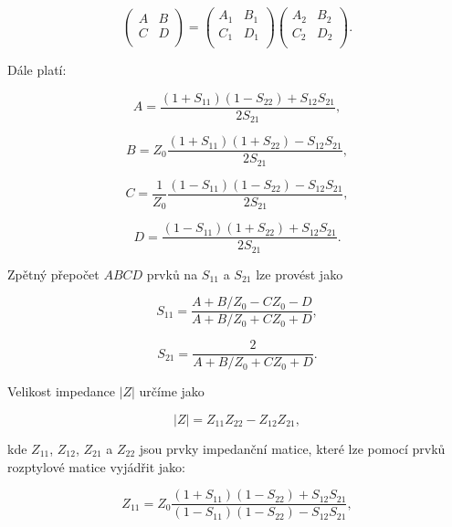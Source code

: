 \documentclass{protokol}
\begin{document}
\[
\begin{pmatrix}
	A & B  \\
	C &	D  \\
\end{pmatrix}
=
\begin{pmatrix}
	A_1 & B_1  \\
	C_1 & D_1  \\
\end{pmatrix}
%
\begin{pmatrix}
	A_2 & B_2  \\
	C_2 & D_2  \\
\end{pmatrix}
.\]

Dále platí:

\begin{equation}
	A = \frac{(1+S_{11})(1-S_{22})+S_{12}S_{21}}{2S_{21}},
\end{equation}

\begin{equation}
	B = Z_0 \frac{(1+S_{11})(1+S_{22})-S_{12}S_{21}}{2S_{21}},
\end{equation}

\begin{equation}
	C = \frac{1}{Z_0} \frac{(1-S_{11})(1-S_{22})-S_{12}S_{21}}{2S_{21}},
\end{equation}

\begin{equation}
	D = \frac{(1-S_{11})(1+S_{22})+S_{12}S_{21}}{2S_{21}}.
\end{equation}

Zpětný přepočet $ABCD$ prvků na $S_{11}$ a $S_{21}$ lze provést jako

\begin{equation}
	S_{11} = \frac{A+B/Z_0-CZ_0-D}{A+B/Z_0+CZ_0+D},
\end{equation}

\begin{equation}
	S_{21} = \frac{2}{A+B/Z_0+CZ_0+D}.
\end{equation}


Velikost impedance $|Z|$ určíme jako

\begin{equation}
	|Z| = Z_{11}Z_{22}-Z_{12}Z_{21},
\end{equation}

kde $Z_{11}$, $Z_{12}$, $Z_{21}$ a $Z_{22}$ jsou prvky impedanční matice, které lze pomocí prvků rozptylové matice vyjádřit jako:

\begin{equation}
	Z_{11} = Z_0 \frac{(1+S_{11})(1-S_{22})+S_{12}S_{21}}{(1-S_{11})(1-S_{22})-S_{12}S_{21}},
\end{equation}
\end{document}
